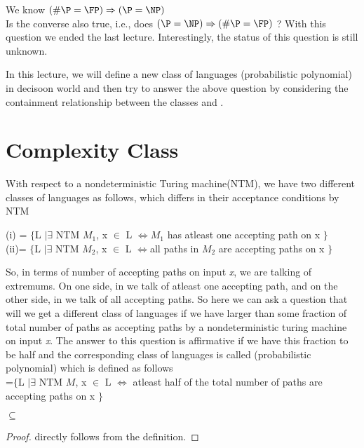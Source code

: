 \documentclass[11pt]{article}
\begin{document}

We know $(\#\P = \FP) \implies (\P = \NP)$\\
Is the converse also true, i.e., does $(\P = \NP) \implies (\#\P = \FP)$ ?
With this question we ended the last lecture. Interestingly, the status of this
question is still unknown.

In this lecture, we will define a new class of languages \PP(probabilistic polynomial)
in decisoon world and then try to answer the above question by considering the 
containment relationship between the classes \PP and \NP. 


\section{Complexity Class \PP}
With respect to a nondeterministic Turing machine(NTM), we have two different
classes of languages as follows, which differs in their acceptance conditions by NTM 

(i) \NP = $\{$L $|\exists$ NTM $M_1$, x $\in$ L $\iff M_1$ has atleast one accepting path on x $\}$\\
(ii)\coNP = $\{$L $|\exists$ NTM $M_2$, x $\in$ L $\iff$all paths in $M_2$ are accepting paths on x $\}$

So, in terms of number of accepting paths on input {\em x}, we are talking of
extremums. On one side, in \NP  we talk of atleast one accepting path, and on
the other side, in \coNP  we talk of all accepting paths. So here we can ask a
question that will we get a different class of languages if we have larger than some fraction 
of total number of paths as accepting paths by a nondeterministic turing machine
on input {\em x}. The answer to this question is affirmative if we have this fraction
to be half and the corresponding class of languages is called \PP (probabilistic polynomial)
which is defined as follows \\ 

\PP =$\{$L $|\exists$ NTM $M$, x $\in$ L $\iff$ atleast half of the total number of paths are accepting paths on x $\}$

\begin{claim}
 \coNP $\subseteq$ \PP
\end{claim}
\begin{proof}
 directly follows from the definition.
\end{proof}
\end{document}
